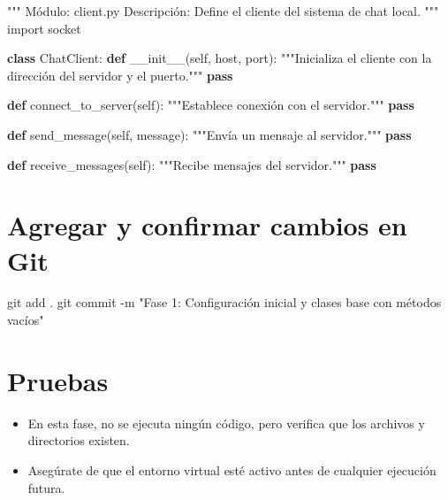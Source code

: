 \documentclass[
  a4paper,
  DIV=11,
  numbers=noendperiod,
  onepage,
  openany]{scrreprt}
\newenvironment{Shaded}{\begin{snugshade}}{\end{snugshade}}
\newcommand{\AttributeTok}[1]{\textcolor[rgb]{0.40,0.45,0.13}{#1}}
\newcommand{\CommentTok}[1]{\textcolor[rgb]{0.37,0.37,0.37}{#1}}
\newcommand{\ControlFlowTok}[1]{\textcolor[rgb]{0.00,0.23,0.31}{\textbf{#1}}}
\newcommand{\FunctionTok}[1]{\textcolor[rgb]{0.28,0.35,0.67}{#1}}
\newcommand{\ImportTok}[1]{\textcolor[rgb]{0.00,0.46,0.62}{#1}}
\newcommand{\KeywordTok}[1]{\textcolor[rgb]{0.00,0.23,0.31}{\textbf{#1}}}
\newcommand{\NormalTok}[1]{\textcolor[rgb]{0.00,0.23,0.31}{#1}}
\newcommand{\StringTok}[1]{\textcolor[rgb]{0.13,0.47,0.30}{#1}}
\newcommand{\VariableTok}[1]{\textcolor[rgb]{0.07,0.07,0.07}{#1}}
\begin{document}
\begin{Shaded}
\begin{Highlighting}[]
\CommentTok{"""}
\CommentTok{Módulo: client.py}
\CommentTok{Descripción: Define el cliente del sistema de chat local.}
\CommentTok{"""}
\ImportTok{import}\NormalTok{ socket}

\KeywordTok{class}\NormalTok{ ChatClient:}
    \KeywordTok{def} \FunctionTok{\_\_init\_\_}\NormalTok{(}\VariableTok{self}\NormalTok{, host, port):}
        \CommentTok{"""Inicializa el cliente con la dirección del servidor y el puerto."""}
        \ControlFlowTok{pass}

    \KeywordTok{def}\NormalTok{ connect\_to\_server(}\VariableTok{self}\NormalTok{):}
        \CommentTok{"""Establece conexión con el servidor."""}
        \ControlFlowTok{pass}

    \KeywordTok{def}\NormalTok{ send\_message(}\VariableTok{self}\NormalTok{, message):}
        \CommentTok{"""Envía un mensaje al servidor."""}
        \ControlFlowTok{pass}

    \KeywordTok{def}\NormalTok{ receive\_messages(}\VariableTok{self}\NormalTok{):}
        \CommentTok{"""Recibe mensajes del servidor."""}
        \ControlFlowTok{pass}
\end{Highlighting}
\end{Shaded}

\section{Agregar y confirmar cambios en
Git}\label{agregar-y-confirmar-cambios-en-git}

\begin{Shaded}
\begin{Highlighting}[]
\FunctionTok{git}\NormalTok{ add .}
\FunctionTok{git}\NormalTok{ commit }\AttributeTok{{-}m} \StringTok{"Fase 1: Configuración inicial y clases base con métodos vacíos"}
\end{Highlighting}
\end{Shaded}

\section{Pruebas}\label{pruebas}

\begin{itemize}
\item
  En esta fase, no se ejecuta ningún código, pero verifica que los
  archivos y directorios existen.
\item
  Asegúrate de que el entorno virtual esté activo antes de cualquier
  ejecución futura.
\end{itemize}
\end{document}
